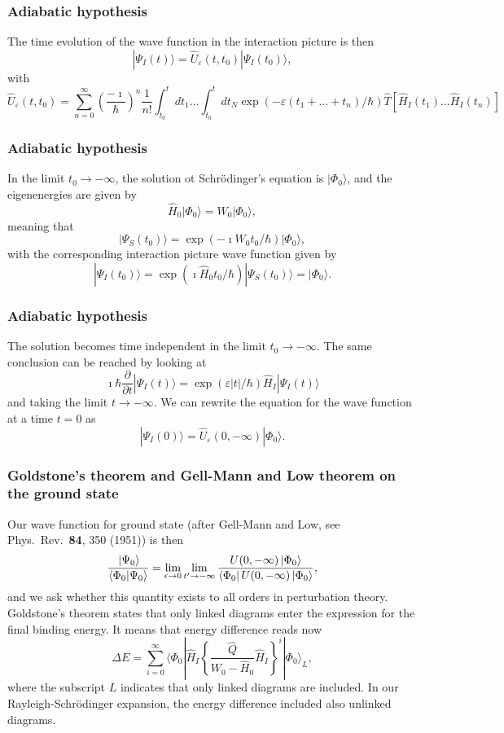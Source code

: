 \frame
{
\frametitle{Adiabatic hypothesis}
\begin{small}
{\scriptsize
The time evolution of the wave function in the interaction picture is then
\[
|\Psi_I(t) \rangle = \hat{U}_{\varepsilon}(t,t_0)|\Psi_I(t_0)\rangle,
\]
with 
\[
\hat{U}_{\varepsilon}(t,t_0)=\sum_{n=0}^{\infty}\left(\frac{-\imath}{\hbar}\right)^n\frac{1}{n!}
\int_{t_0}^t dt_1\dots \int_{t_0}^t dt_N \exp{(-\varepsilon(t_1+\dots+t_n)/\hbar)}\hat{T}\left[\hat{H}_I(t_1)\dots\hat{H}_I(t_n)\right]
\]

}
\end{small}
}

\frame
{
\frametitle{Adiabatic hypothesis}
\begin{small}
{\scriptsize
In the limit $t_0\rightarrow -\infty$, the solution ot Schr\"odinger's equation is
$|\Phi_0\rangle$, and the eigenenergies are given by 
\[
\hat{H}_0|\Phi_0\rangle=W_0|\Phi_0\rangle,
\]
meaning that 
\[
|\Psi_S(t_0)\rangle = \exp{(-\imath W_0t_0/\hbar)}|\Phi_0\rangle,
\]
with the corresponding interaction picture wave function given by
\[
|\Psi_I(t_0)\rangle = \exp{(\imath \hat{H}_0t_0/\hbar)}|\Psi_S(t_0)\rangle=|\Phi_0\rangle.
\]
}
\end{small}
}


\frame
{
\frametitle{Adiabatic hypothesis}
\begin{small}
{\scriptsize
The solution becomes time independent in the limit $t_0\rightarrow -\infty$.
The same conclusion can be reached by looking at 
\[
\imath \hbar\frac{\partial }{\partial t}|\Psi_I(t)\rangle =
\exp{(\varepsilon |t|/\hbar)}\hat{H}_I|\Psi_I(t)\rangle 
\]
and taking the limit $t\rightarrow -\infty$.
We can rewrite the equation for the wave function at a time $t=0$ as
\[
|\Psi_I(0) \rangle = \hat{U}_{\varepsilon}(0,-\infty)|\Phi_0\rangle.
\]
}
\end{small}
}

\frame
{
\frametitle{Goldstone's theorem and Gell-Mann and Low theorem on the ground state}
\begin{small}
{\scriptsize
Our wave function for ground state (after Gell-Mann and Low, see Phys.~Rev.~{\bf 84}, 350 (1951)) is then
\[
        \frac{\,|{\Psi_0}\rangle}{\left\langle\Phi_0 | \Psi_0 \right\rangle}=
    \lim_{\epsilon \rightarrow 0}
   \lim_{t'\rightarrow -\infty}
   \frac{U(0,-\infty )\,|{\Phi_0}\rangle }
   { \bra{\Phi_0} U(0,-\infty )\,|{\Phi_0}\rangle },
\]
and we ask whether this quantity exists to all orders in perturbation theory.
Goldstone's theorem states that only linked diagrams enter the expression for the final binding energy. It means that energy difference reads now
\[
\Delta E=\sum_{i=0}^{\infty}\langle \Phi_0|\hat{H}_I\left\{\frac{\hat{Q}}{W_0-\hat{H}_0}\hat{H}_I\right\}^i|\Phi_0\rangle_L,
\]
where the subscript $L$ indicates that only linked diagrams are included. In our Rayleigh-Schr\"odinger expansion, the energy difference included also unlinked diagrams. 

}
\end{small}
}

